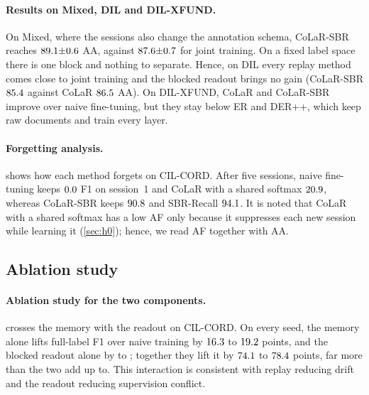 \documentclass[10pt,twocolumn,letterpaper]{article}
\begin{document}
\paragraph{Results on Mixed, DIL and DIL-XFUND.} On Mixed, where the sessions also change the annotation schema, CoLaR-SBR reaches $89.1{\pm}0.6$ AA, against $87.6{\pm}0.7$ for joint training. On a fixed label space there is one block and nothing to separate. Hence, on DIL every replay method comes close to joint training and the blocked readout brings no gain (CoLaR-SBR $85.4$ against CoLaR $86.5$ AA). On DIL-XFUND, CoLaR and CoLaR-SBR improve over naive fine-tuning, but they stay below ER and DER++, which keep raw documents and train every layer.

\paragraph{Forgetting analysis.}  shows how each method forgets on CIL-CORD. After five sessions, naive fine-tuning keeps $0.0$ F1 on session~1 and CoLaR with a shared softmax $20.9$, whereas CoLaR-SBR keeps $90.8$ and SBR-Recall $94.1$. It is noted that CoLaR with a shared softmax has a low AF only because it suppresses each new session while learning it (\cref{sec:h0}); hence, we read AF together with AA.

\subsection{Ablation study}
\label{sec:ablations}
\begin{table}[t]
\centering\small
\setlength{\tabcolsep}{3pt}
\caption{\textbf{The two components} on CIL-CORD (mean $\pm$ s.d. over three seeds).}
\label{tab:2x2}
\resizebox{\linewidth}{!}{}
\end{table}

\paragraph{Ablation study for the two components.}  crosses the memory with the readout on CIL-CORD. On every seed, the memory alone lifts full-label F1 over naive training by $16.3$ to $19.2$ points, and the blocked readout alone by \nAblReadMin{} to \nAblReadMax; together they lift it by $74.1$ to $78.4$ points, far more than the two add up to. This interaction is consistent with replay reducing drift and the readout reducing supervision conflict.
\end{document}
